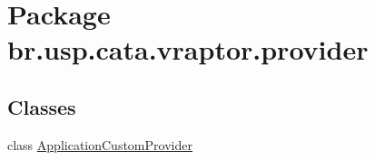 \hypertarget{namespacebr_1_1usp_1_1cata_1_1vraptor_1_1provider}{\section{Package br.\+usp.\+cata.\+vraptor.\+provider}
\label{namespacebr_1_1usp_1_1cata_1_1vraptor_1_1provider}
}
\subsection*{Classes}
\begin{DoxyCompactItemize}
\item 
class \hyperlink{classbr_1_1usp_1_1cata_1_1vraptor_1_1provider_1_1_application_custom_provider}{Application\+Custom\+Provider}
\end{DoxyCompactItemize}
